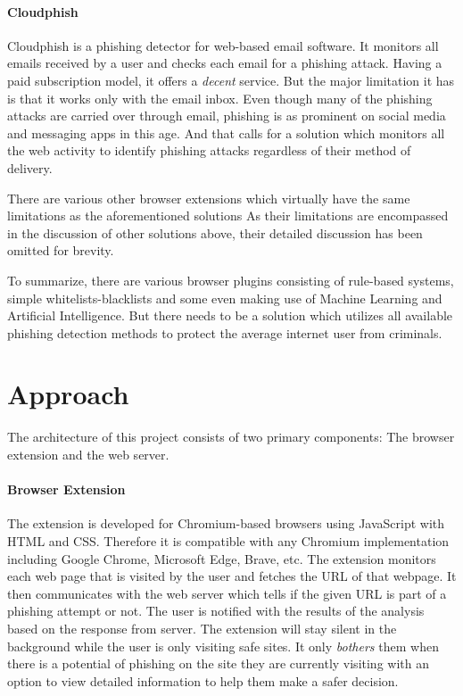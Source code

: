 \documentclass[conference]{IEEEtran}
\begin{document}
\paragraph{Cloudphish\cite{Cloudphish}}
Cloudphish is a phishing detector for web-based email software.
It monitors all emails received by a user and checks each email for a phishing attack.
Having a paid subscription model, it offers a \emph{decent} service.
But the major limitation it has is that it works only with the email inbox.
Even though many of the phishing attacks are carried over through email, phishing is as prominent on social media and messaging apps in this age.
And that calls for a solution which monitors all the web activity to identify phishing attacks regardless of their method of delivery.

\par There are various other browser extensions which virtually have the same limitations as the aforementioned solutions\cite{BlueArca}\cite{Retruster}\cite{PhishingBoat}
As their limitations are encompassed in the discussion of other solutions above, their detailed discussion has been omitted for brevity.

\par To summarize, there are various browser plugins consisting of rule-based systems, simple whitelists-blacklists and some even making use of Machine Learning and Artificial Intelligence. But there needs to be a solution which utilizes all available phishing detection methods to protect the average internet user from criminals.

\section{Approach}
The architecture of this project consists of two primary components: The browser extension and the web server.

\paragraph{Browser Extension}
The extension is developed for Chromium-based browsers using JavaScript with HTML and CSS.
Therefore it is compatible with any Chromium implementation including Google Chrome, Microsoft Edge, Brave, etc.
The extension monitors each web page that is visited by the user and fetches the URL of that webpage.
It then communicates with the web server which tells if the given URL is part of a phishing attempt or not.
The user is notified with the results of the analysis based on the response from server.
The extension will stay silent in the background while the user is only visiting safe sites.
It only \emph{bothers} them when there is a potential of phishing on the site they are currently visiting with an option to view detailed information to help them make a safer decision.
\end{document}
